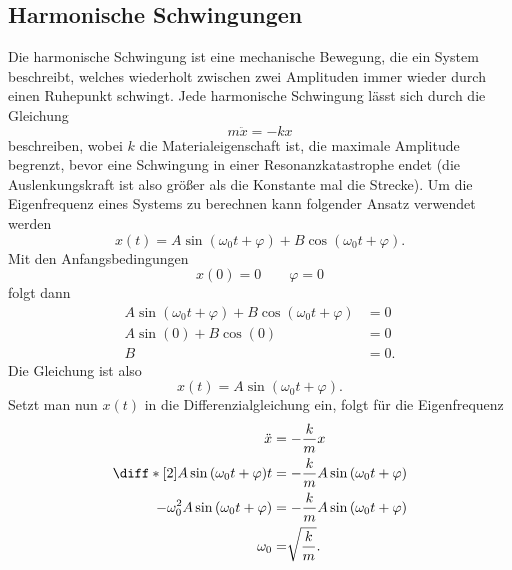 \documentclass[a4paper,12pt]{article}
\begin{document}
\subsection{Harmonische Schwingungen}
Die harmonische Schwingung ist eine mechanische Bewegung, die ein System beschreibt, welches wiederholt zwischen zwei Amplituden immer wieder durch einen Ruhepunkt schwingt. Jede harmonische Schwingung lässt sich durch die Gleichung
\[ 
        m\ddot{x}=-kx
\] 
beschreiben, wobei $k$ die Materialeigenschaft ist, die maximale Amplitude begrenzt, bevor eine Schwingung in einer Resonanzkatastrophe endet (die Auslenkungskraft ist also größer als die Konstante mal die Strecke). Um die Eigenfrequenz eines Systems zu berechnen kann folgender Ansatz verwendet werden
\[ 
        x\left(t\right)=A\sin \left(\omega _0t+\varphi \right)+B\cos \left(\omega _0t+\varphi \right)
.\] 
Mit den Anfangsbedingungen
\[ 
        x\left(0\right)=0\qquad \varphi =0
\]
folgt dann
\begin{align*}
        A\sin \left(\omega _0t+\varphi \right)+B\cos \left(\omega _0t+\varphi \right)&=0\\
        A\sin \left(0\right)+B\cos \left(0\right)&=0\\
        B&=0
.\end{align*}
Die Gleichung ist also
\[ 
        x\left(t\right)=A\sin \left(\omega _0t+\varphi \right)
.\] 
Setzt man nun $x\left(t\right)$ in die Differenzialgleichung ein, folgt für die Eigenfrequenz
\begin{align*}
        \ddot{x}&=-\dfrac{k}{m}x\\
        \diff*[2]{A\sin \left(\omega _0t+\varphi \right)}{t}&=-\dfrac{k}{m}A\sin \left(\omega _0t+\varphi \right)\\
        -\omega _0^2A\sin \left(\omega _0t+\varphi \right)&=-\dfrac{k}{m}A\sin \left(\omega _0t+\varphi \right)\\
        \omega _0&=\sqrt[]{\dfrac{k}{m}}
.\end{align*}
\end{document}
